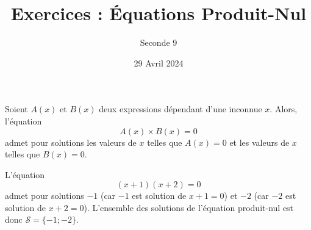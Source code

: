 \documentclass{exam}
\title{Exercices : Équations Produit-Nul}
\date{29 Avril 2024}
\author{Seconde 9}
\begin{document}
\maketitle

\begin{tcolorbox}
\begin{proposition}
Soient $A(x)$ et $B(x)$ deux expressions dépendant d'une inconnue $x$. Alors, l'équation
\begin{equation*}
A(x) \times B(x) = 0    
\end{equation*}
admet pour solutions les valeurs de $x$ telles que $A(x) = 0$ et les valeurs de $x$ telles que $B(x) = 0$.
\end{proposition}
\end{tcolorbox}
\begin{example}
L'équation
\begin{equation*}
(x+1)(x+2)=0    
\end{equation*}
admet pour solutions $-1$ (car $-1$ est solution de $x+1=0$) et $-2$ (car $-2$ est solution de $x+2=0$). L'ensemble des solutions de l'équation produit-nul est donc $\mathcal{S}=\{-1;-2\}$.
\end{example}
\end{document}
